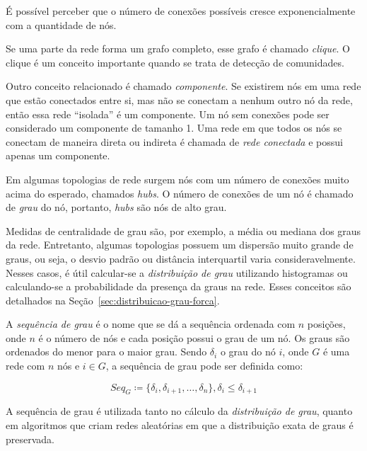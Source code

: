 \documentclass[12pt,a4paper]{article}
\theoremstyle{hypo}
\newcommand{\defn}{\coloneqq} %
\begin{document}
É possível perceber que o número de conexões possíveis cresce exponencialmente com a quantidade de nós.

Se uma parte da rede forma um grafo completo, esse grafo é chamado \textit{clique}. O clique é um conceito importante quando se trata de detecção de comunidades.


Outro conceito relacionado é chamado \textit{componente}. Se existirem nós em uma rede que estão conectados entre si, mas não se conectam a nenhum outro nó da rede, então essa rede \enquote{isolada} é um componente. Um nó sem conexões pode ser considerado um componente de tamanho 1. Uma rede em que todos os nós se conectam de maneira direta ou indireta é chamada de \textit{rede conectada} e possui apenas um componente.


Em algumas topologias de rede surgem nós com um número de conexões muito acima do esperado, chamados \textit{hubs}. O número de conexões de um nó é chamado de \textit{grau} do nó, portanto, \textit{hubs} são nós de alto grau.

Medidas de centralidade de grau são, por exemplo, a média ou mediana dos graus da rede. Entretanto, algumas topologias possuem um dispersão muito grande de graus, ou seja, o desvio padrão ou distância interquartil varia consideravelmente. Nesses casos, é útil calcular-se a \textit{distribuição de grau} utilizando histogramas ou calculando-se a probabilidade da presença da graus na rede. Esses conceitos são detalhados na Seção~\ref{sec:distribuicao-grau-forca}.

A \textit{sequência de grau} é o nome que se dá a sequência ordenada com $n$ posições, onde $n$ é o número de nós e cada posição possui o grau de um nó. Os graus são ordenados do menor para o maior grau. Sendo $\delta_i$ o grau do nó $i$, onde $G$ é uma rede com $n$ nós e $i \in G$, a sequência de grau pode ser definida como:

\begin{equation} \label{eq:sequencia-grau}
\textit{Seq}_G \defn \{\delta_i, \delta_{i+1}, \ldots, \delta_n\}, \delta_i \le \delta_{i+1}
\end{equation}

A sequência de grau é utilizada tanto no cálculo da \textit{distribuição de grau}, quanto em algoritmos que criam redes aleatórias em que a distribuição exata de graus é preservada.
\end{document}

